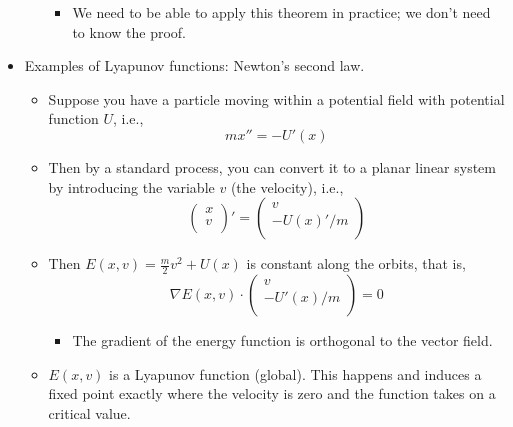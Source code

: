 \documentclass[../notes.tex]{subfiles}
\begin{document}
\begin{itemize}
\begin{itemize}
\begin{itemize}
            \item We need to be able to apply this theorem in practice; we don't need to know the proof.
        \end{itemize}
    \end{itemize}
    \item Examples of Lyapunov functions: Newton's second law.
    \begin{itemize}
        \item Suppose you have a particle moving within a potential field with potential function $U$, i.e.,
        \begin{equation*}
            mx'' = -U'(x)
        \end{equation*}
        \item Then by a standard process, you can convert it to a planar linear system by introducing the variable $v$ (the velocity), i.e.,
        \begin{equation*}
            \begin{pmatrix}
                x\\
                v\\
            \end{pmatrix}'
            =
            \begin{pmatrix}
                v\\
                -U(x)'/m\\
            \end{pmatrix}
        \end{equation*}
        \item Then $E(x,v)=\frac{m}{2}v^2+U(x)$ is constant along the orbits, that is,
        \begin{equation*}
            \nabla E(x,v)\cdot
            \begin{pmatrix}
                v\\
                -U'(x)/m\\
            \end{pmatrix}
            = 0
        \end{equation*}
        \begin{itemize}
            \item The gradient of the energy function is orthogonal to the vector field.
        \end{itemize}
        \item $E(x,v)$ is a Lyapunov function (global). This happens and induces a fixed point exactly where the velocity is zero and the function takes on a critical value.

\end{itemize}
\end{itemize}
\end{document}
